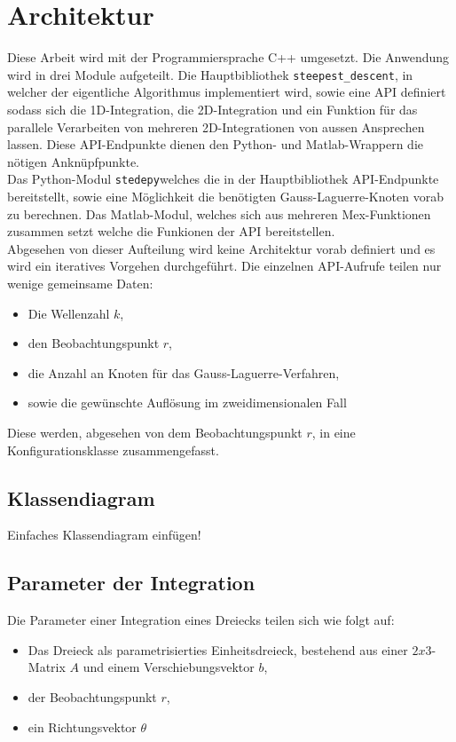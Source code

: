 \section{Architektur}

Diese Arbeit wird mit der Programmiersprache C++ umgesetzt.
Die Anwendung wird in drei Module aufgeteilt. 
Die Hauptbibliothek \texttt{steepest\_descent}, in welcher der eigentliche Algorithmus implementiert wird, sowie eine API definiert sodass sich die 1D-Integration, die 2D-Integration und ein Funktion für das parallele Verarbeiten von mehreren 2D-Integrationen von aussen Ansprechen lassen.
Diese API-Endpunkte dienen den Python- und Matlab-Wrappern die nötigen Anknüpfpunkte. 
\\
Das Python-Modul \texttt{stedepy}welches die in der Hauptbibliothek API-Endpunkte bereitstellt, sowie eine Möglichkeit die benötigten Gauss-Laguerre-Knoten vorab zu berechnen.
Das Matlab-Modul, welches sich aus mehreren Mex-Funktionen zusammen setzt welche die Funkionen der API bereitstellen.
\\
Abgesehen von dieser Aufteilung wird keine Architektur vorab definiert und es wird ein iteratives Vorgehen durchgeführt.
Die einzelnen API-Aufrufe teilen nur wenige gemeinsame Daten:
\begin{itemize}
    \item Die Wellenzahl $k$,
    \item den Beobachtungspunkt $r$,
    \item die Anzahl an Knoten für das Gauss-Laguerre-Verfahren,
    \item sowie die gewünschte Auflösung im zweidimensionalen Fall
\end{itemize}
Diese werden, abgesehen von dem Beobachtungspunkt $r$, in eine Konfigurationsklasse zusammengefasst.

\subsection{Klassendiagram}

Einfaches Klassendiagram einfügen!
\pagebreak

\subsection{Parameter der Integration}

Die Parameter einer Integration eines Dreiecks teilen sich wie folgt auf:

\begin{itemize}
    \item Das Dreieck als parametrisierties Einheitsdreieck, bestehend aus einer $2x3$-Matrix $A$ und einem Verschiebungsvektor $b$,
    \item der Beobachtungspunkt $r$,
    \item ein Richtungsvektor $\theta$
\end{itemize}

